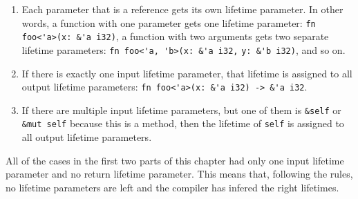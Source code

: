 \begin{enumerate}[noitemsep]
    \item Each parameter that is a reference gets its own lifetime parameter. In other words, a function with one parameter gets one lifetime parameter: \verb|fn foo<'a>(x: &'a i32)|, a function with two arguments gets two separate lifetime parameters: \verb|fn foo<'a, 'b>(x: &'a i32,| \verb|y: &'b i32)|, and so on.
\item If there is exactly one input lifetime parameter, that lifetime is assigned to all output lifetime parameters: \verb|fn foo<'a>(x: &'a i32) -> &'a i32|.
\item If there are multiple input lifetime parameters, but one of them is \verb|&self| or \verb|&mut self| because this is a method, then the lifetime of \verb|self| is assigned to all output lifetime parameters.
\end{enumerate}

All of the cases in the first two parts of this chapter had only one input lifetime parameter and no return lifetime parameter. This means that, following the rules, no lifetime parameters are left and the compiler has infered the right lifetimes. 



%    

